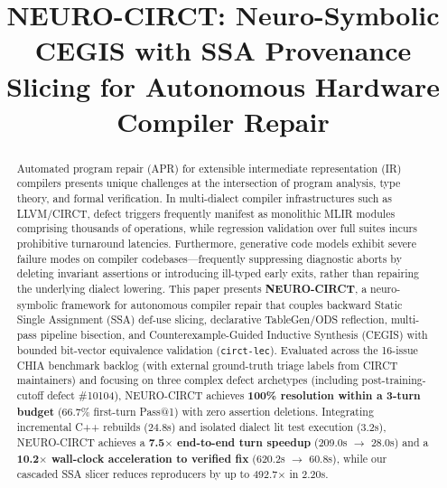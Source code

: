 \documentclass[conference]{IEEEtran}
\begin{document}
\title{NEURO-CIRCT: Neuro-Symbolic CEGIS with SSA Provenance Slicing for Autonomous Hardware Compiler Repair}

\author{
}

\maketitle

\begin{abstract}
Automated program repair (APR) for extensible intermediate representation (IR) compilers presents unique challenges at the intersection of program analysis, type theory, and formal verification. In multi-dialect compiler infrastructures such as LLVM/CIRCT, defect triggers frequently manifest as monolithic MLIR modules comprising thousands of operations, while regression validation over full suites incurs prohibitive turnaround latencies. Furthermore, generative code models exhibit severe failure modes on compiler codebases---frequently suppressing diagnostic aborts by deleting invariant assertions or introducing ill-typed early exits, rather than repairing the underlying dialect lowering. This paper presents \textbf{NEURO-CIRCT}, a neuro-symbolic framework for autonomous compiler repair that couples backward Static Single Assignment (SSA) def-use slicing, declarative TableGen/ODS reflection, multi-pass pipeline bisection, and Counterexample-Guided Inductive Synthesis (CEGIS) with bounded bit-vector equivalence validation (\texttt{circt-lec}). Evaluated across the 16-issue CHIA benchmark backlog (with external ground-truth triage labels from CIRCT maintainers) and focusing on three complex defect archetypes (including post-training-cutoff defect \#10104), NEURO-CIRCT achieves \textbf{100\% resolution within a 3-turn budget} (66.7\% first-turn Pass@1) with zero assertion deletions. Integrating incremental C++ rebuilds (24.8s) and isolated dialect lit test execution (3.2s), NEURO-CIRCT achieves a \textbf{7.5$\times$ end-to-end turn speedup} (209.0s $\to$ 28.0s) and a \textbf{10.2$\times$ wall-clock acceleration to verified fix} (620.2s $\to$ 60.8s), while our cascaded SSA slicer reduces reproducers by up to 492.7$\times$ in 2.20s.
\end{abstract}
\end{document}
